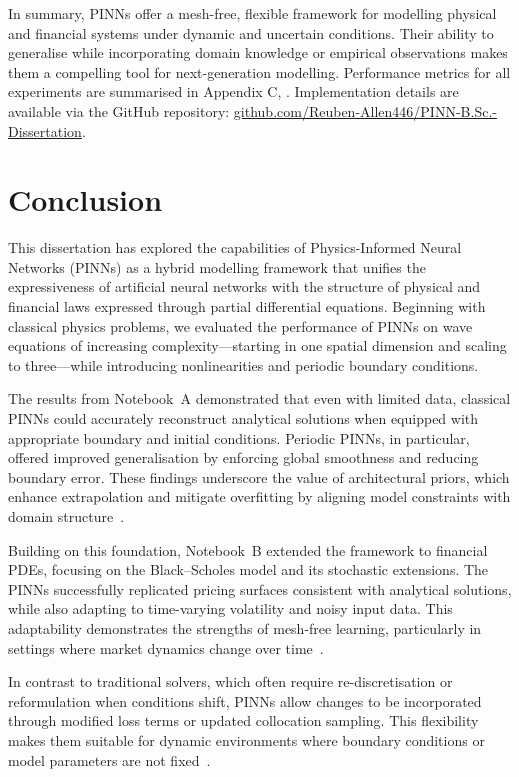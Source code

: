 \documentclass[12pt,a4paper]{article}
\begin{document}
In summary, PINNs offer a mesh-free, flexible framework for modelling physical and financial systems under dynamic and uncertain conditions. Their ability to generalise while incorporating domain knowledge or empirical observations makes them a compelling tool for next-generation modelling. Performance metrics for all experiments are summarised in Appendix C, . Implementation details are available via the GitHub repository: \href{https://github.com/Reuben-Allen446/PINN-B.Sc.-Dissertation}{github.com/Reuben-Allen446/PINN-B.Sc.-Dissertation}.


\section{Conclusion}

This dissertation has explored the capabilities of Physics-Informed Neural Networks (PINNs) as a hybrid modelling framework that unifies the expressiveness of artificial neural networks with the structure of physical and financial laws expressed through partial differential equations. Beginning with classical physics problems, we evaluated the performance of PINNs on wave equations of increasing complexity—starting in one spatial dimension and scaling to three—while introducing nonlinearities and periodic boundary conditions.

The results from Notebook~A demonstrated that even with limited data, classical PINNs could accurately reconstruct analytical solutions when equipped with appropriate boundary and initial conditions. Periodic PINNs, in particular, offered improved generalisation by enforcing global smoothness and reducing boundary error. These findings underscore the value of architectural priors, which enhance extrapolation and mitigate overfitting by aligning model constraints with domain structure~\cite{zhu2022periodic}.

Building on this foundation, Notebook~B extended the framework to financial PDEs, focusing on the Black--Scholes model and its stochastic extensions. The PINNs successfully replicated pricing surfaces consistent with analytical solutions, while also adapting to time-varying volatility and noisy input data. This adaptability demonstrates the strengths of mesh-free learning, particularly in settings where market dynamics change over time~\cite{sirignano2018deep}.

In contrast to traditional solvers, which often require re-discretisation or reformulation when conditions shift, PINNs allow changes to be incorporated through modified loss terms or updated collocation sampling. This flexibility makes them suitable for dynamic environments where boundary conditions or model parameters are not fixed~\cite{karniadakis2021physics}.
\end{document}
